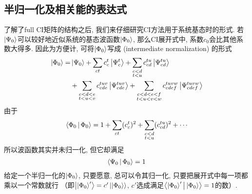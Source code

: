 \subsection{半归一化及相关能的表达式}
了解了full CI矩阵的结构之后, 
我们来仔细研究CI方法用于系统基态时的形式. 
若$\Ket{\Psi_0}$可以较好地近似系统的基态波函数$\Ket{\Phi_0}$, 
那么CI展开式中, 
系数$c_0$会比其他系数大得多. 
因此为方便计, 
可将$\Ket{\Phi_0}$写成\emph{} (intermediate normalization) 的形式
\begin{align}
\label{4.4}
\Ket{\Phi_0} =& \Ket{\Psi_0} + \sum_{ct}c_c^t\Ket{\Psi_c^t} + \sum_{\substack{c<d\\t<u}} c_{cd}^{tu}\Ket{\Psi_{cd}^{tu}}\notag\\
&+\sum_{\substack{c<d<e\\t<u<v}} c_{cde}^{tuv}\Ket{\Psi_{cde}^{tuv}} +\sum_{\substack{c<d<e<f\\t<u<v<w}} c_{cdef}^{tuvw}\Ket{\Psi_{cdef}^{tuvw}}
\end{align}
由于
\begin{align}
\Braket{\Phi_0|\Phi_0} = 1 + \sum_{ct}(c_c^t)^2 + \sum_{\substack{c<d\\t<u}} (c_{cd}^{tu})^2 + \cdots \notag
\end{align}
所以波函数其实并未归一化, 
但它却满足
\begin{align}
\Braket{\Psi_0|\Phi_0} =1
\end{align}
给定一个半归一化的$\Ket{\Phi_0}$, 
只要愿意, 
总可以令其归一化, 
只要把展开式中每一项都乘以一个常数就行 （即$\Ket{\Ket{\Phi_0}'}=c'\Ket{\Ket{\Phi_0}}$, 
$c'$选成满足$\Braket{\Ket{\Phi_0}'|\Ket{\Phi_0}}=1$的数）.


\makeatletter
\HyRef@currentHtag
\makeatother


